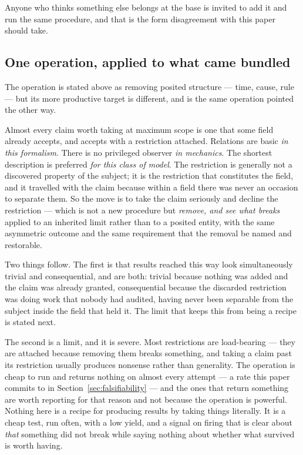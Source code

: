 \documentclass[11pt,a4paper]{article}
\theoremstyle{remark}\newtheorem{remark}[proposition]{Remark}
\begin{document}
Anyone who thinks something else belongs at the base is invited to add it and run the same procedure,
and that is the form disagreement with this paper should take.

\subsection*{One operation, applied to what came bundled}
The operation is stated above as removing posited structure --- time, cause, rule ---
but its more productive target is different, and is the same operation pointed the other way.

Almost every claim worth taking at maximum scope is one that some field already accepts, and accepts
with a restriction attached. Relations are basic \emph{in this formalism}. There is no privileged
observer \emph{in mechanics}. The shortest description is preferred \emph{for this class of model}.
The restriction is generally not a discovered property of the subject; it is the restriction that
constitutes the field, and it travelled with the claim because within a field there was never an
occasion to separate them. So the move is to take the claim seriously and decline the restriction ---
which is not a new procedure but \emph{remove, and see what breaks} applied to an inherited limit
rather than to a posited entity, with the same asymmetric outcome and the same requirement that the
removal be named and restorable.

Two things follow. The
first is that results reached this way look simultaneously trivial and consequential, and are both:
trivial because nothing was added and the claim was already granted, consequential because the
discarded restriction was doing work that nobody had audited, having never been separable from the
subject inside the field that held it. The limit that keeps this from being a recipe is stated next.

The second is a limit, and it is severe. Most restrictions are load-bearing --- they are attached
because removing them breaks something, and taking a claim past its restriction usually produces
nonsense rather than generality. The operation is cheap to run and returns nothing on almost every
attempt --- a rate this paper commits to in Section~\ref{sec:falsifiability} --- and the ones that
return something are worth reporting for that reason and not because
the operation is powerful. Nothing here is a recipe for producing results by taking things literally.
It is a cheap test, run often, with a low yield, and a signal on firing that is clear about \emph{that}
something did not break while saying nothing about whether what survived is worth having.
\end{document}
